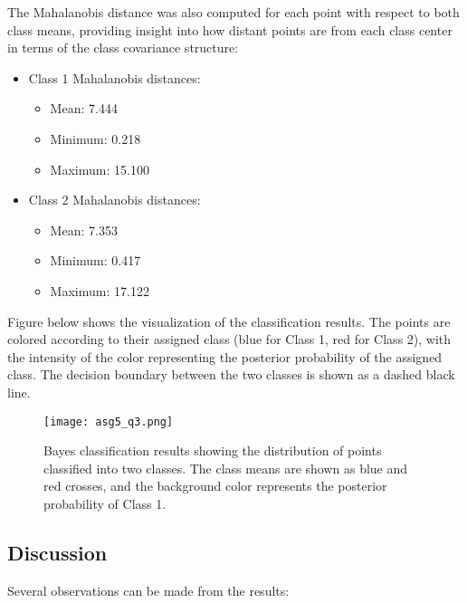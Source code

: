 \documentclass[12pt]{article}
\begin{document}
The Mahalanobis distance was also computed for each point with respect to both class means, providing insight into how distant points are from each class center in terms of the class covariance structure:

\begin{itemize}
    \item Class 1 Mahalanobis distances:
    \begin{itemize}
        \item Mean: 7.444
        \item Minimum: 0.218
        \item Maximum: 15.100
    \end{itemize}
    \item Class 2 Mahalanobis distances:
    \begin{itemize}
        \item Mean: 7.353
        \item Minimum: 0.417
        \item Maximum: 17.122
    \end{itemize}
\end{itemize}

Figure below shows the visualization of the classification results. The points are colored according to their assigned class (blue for Class 1, red for Class 2), with the intensity of the color representing the posterior probability of the assigned class. The decision boundary between the two classes is shown as a dashed black line.
\begin{figure}[H]
    \centering
    \texttt{[image: asg5\_q3.png]}
    \caption{Bayes classification results showing the distribution of points classified into two classes. The class means are shown as blue and red crosses, and the background color represents the posterior probability of Class 1.}
    \label{fig:enter-label}
\end{figure}

\subsection{Discussion}
Several observations can be made from the results:
\end{document}
